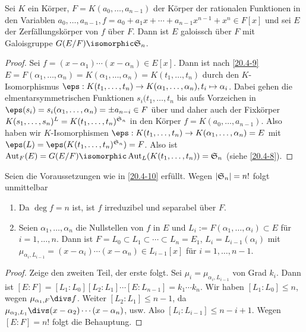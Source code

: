 \begin{kor} \label{20.4-10}
	Sei $K$ ein Körper, $F = K(a_0, \dotsc, a_{n-1})$ der Körper der rationalen Funktionen in den Variablen $a_0, \dotsc, a_{n-1}, f = a_0 + a_1 x + \dotsb + a_{n-1} x^{n-1} + x^n \in F[x]$ und sei $E$ der Zerfällungskörper von $f$ über $F$.
	Dann ist $E$ galoissch über $F$ mit Galoisgruppe $G(E / F) \isomorphic \S_n$.
	\begin{proof}
		 Sei $f = (x-\alpha_1) \dotsb (x-\alpha_n) \in E[x]$.
		 Dann ist nach \ref{20.4-9} $E = F(\alpha_1, \dotsc, \alpha_n) = K(\alpha_1, \dotsc, \alpha_n) = K(t_1, \dotsc, t_n)$ durch den $K$-Isomorphismus $\eps: K(t_1, \dotsc, t_n) \to K(\alpha_1, \dotsc, \alpha_n), t_i \mapsto \alpha_i$.
		 Dabei gehen die elmentarsymmetrischen Funktionen $s_i(t_1, \dotsc, t_n$ bis aufs Vorzeichen in $\eps(s_i) = s_i(\alpha_1, \dotsc, \alpha_n) = \pm a_{n-i} \in F$ über und daher auch der Fixkörper $K(s_1, \dotsc, s_n)^L = K(t_1, \dotsc, t_n)^{\S_n}$ in den Körper $f = K(a_0, \dotsc, a_{n-1})$.
		 Also haben wir $K$-Isomorphismen $\eps: K(t_1, \dotsc, t_n) \to K(\alpha_1, \dotsc, \alpha_n) = E$ mit $\eps(L) = \eps(K(t_1, \dotsc, t_n)^{\S_n}) = F$.
		 Also ist $\Aut_F(E) = G(E / F) \isomorphic \Aut_L (K(t_1, \dotsc, t_n)) = \S_n$ (siehe \ref{20.4-8}).
	\end{proof}
\end{kor}

\begin{nt} \label{20.4-11}
	Seien die Voraussetzungen wie in \ref{20.4-10} erfüllt.
	Wegen $|\S_n| = n!$ folgt unmittelbar
	\begin{enumerate}[1.]
		\item
			Da $\deg f = n$ ist, ist $f$ irreduzibel und separabel über $F$.
		\item
			Seien $\alpha_1, \dotsc, \alpha_n$ die Nullstellen von $f$ in $E$ und $L_i := F(\alpha_1, \dotsc, \alpha_i) \subset E$ für $i = 1, \dotsc, n$.
			Dann ist $F = L_0 \subset L_1 \subset \dotsb \subset L_n = E_1$, $L_i = L_{i-1}(\alpha_i)$ mit $\mu_{\alpha_i, L_{i-1}} = (x-\alpha_i)\dotsb (x-\alpha_n) \in L_{i-1}[x]$ für $i = 1, \dotsc, n-1$.
	\end{enumerate}
	\begin{proof}
		Zeige den zweiten Teil, der erste folgt.
		Sei $\mu_i = \mu_{\alpha_i, L_{i-1}}$ von Grad $k_i$.
		Dann ist $[E : F] = [L_1 : L_0 ][L_2 : L_1] \dotsb [E : L_{n-1}] = k_1 \dotsb k_n$.
		Wir haben $[L_1 : L_0] \le n$, wegen $\mu_{\alpha_1, F} \divs f$.
		Weiter $[L_2 : L_1] \le n-1$, da $\mu_{\alpha_2, L_1} \divs (x-\alpha_2) \dotsb (x-\alpha_n)$, usw.
		Also $[L_i : L_{i-1}] \le n - i + 1$.
		Wegen $[E : F] = n!$ folgt die Behauptung.
	\end{proof}
\end{nt}

